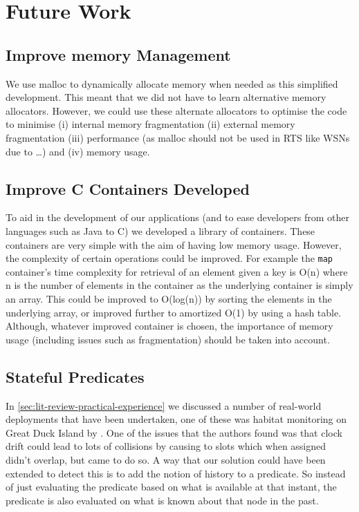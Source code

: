 \section{Future Work}

\subsection{Improve memory Management}

We use malloc to dynamically allocate memory when needed as this simplified development. This meant that we did not have to learn alternative memory allocators. However, we could use these alternate allocators to optimise the code to minimise (i) internal memory fragmentation (ii) external memory fragmentation (iii) performance (as malloc should not be used in RTS like WSNs due to \ldots) and (iv) memory usage.


\subsection{Improve C Containers Developed}

To aid in the development of our applications (and to ease developers from other languages such as Java to C) we developed a library of containers. These containers are very simple with the aim of having low memory usage. However, the complexity of certain operations could be improved. For example the \verb|map| container's time complexity for retrieval of an element given a key is O(n) where n is the number of elements in the container as the underlying container is simply an array. This could be improved to O(log(n)) by sorting the elements in the underlying array, or improved further to amortized O(1) by using a hash table. Although, whatever improved container is chosen, the importance of memory usage (including issues such as fragmentation) should be taken into account.

\subsection{Stateful Predicates}

In \autoref{sec:lit-review-practical-experience} we discussed a number of real-world deployments that have been undertaken, one of these was habitat monitoring on Great Duck Island by \citeauthor{SzewczykPMC04}. One of the issues that the authors found was that clock drift could lead to lots of collisions by causing to slots which when assigned didn't overlap, but came to do so. A way that our solution could have been extended to detect this is to add the notion of history to a predicate. So instead of just evaluating the predicate based on what is available at that instant, the predicate is also evaluated on what is known about that node in the past.

